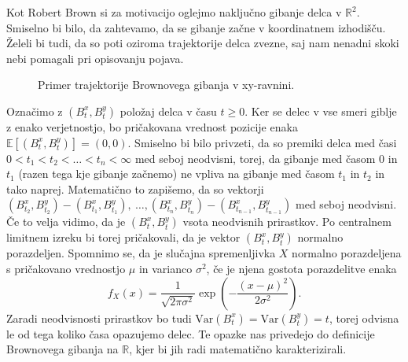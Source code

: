 \documentclass[twoside,11pt]{article}
\begin{document}
Kot Robert Brown si za motivacijo oglejmo naključno gibanje delca v $\mathbb{R}^2$.
Smiselno bi bilo, da zahtevamo, da se gibanje začne v koordinatnem izhodišču. Želeli bi tudi, da so 
poti oziroma trajektorije delca zvezne, saj nam nenadni skoki nebi pomagali pri opisovanju 
pojava.  

\begin{figure}[h]
    \centering

    \caption{Primer trajektorije Brownovega gibanja v xy-ravnini.}
    \label{fig:slika1}
\end{figure}

\noindent
Označimo z $\left(B^x_{t}, B^y_{t}\right)$ položaj delca v času $t \geq 0$. Ker se delec v vse 
smeri giblje z enako verjetnostjo, bo pričakovana vrednost pozicije enaka $\mathbb{E}\left[(B_t^x, B_t^y)\right] = (0, 0).$
Smiselno bi bilo privzeti, da so premiki delca med časi $0 < t_1 < t_2 < \dots < t_n < \infty$ med seboj neodvisni, torej, 
da gibanje med časom $0$ in $t_1$ (razen tega kje gibanje začnemo) ne vpliva na gibanje med časom $t_1$ in $t_2$ in tako naprej.
Matematično to zapišemo, da so vektorji $(B^x_{t_2}, B^y_{t_2}) - (B^x_{t_1}, B^y_{t_1}), \ \dots, (B^x_{t_n}, B^y_{t_n}) - (B^x_{t_{n-1}}, B^y_{t_{n-1}})$
med seboj neodvisni. Če to velja vidimo, da je $\left(B^x_{t}, B^y_{t}\right)$ vsota neodvisnih prirastkov. Po centralnem 
limitnem izreku bi torej pričakovali, da je vektor $\left(B^x_{t}, B^y_{t}\right)$ normalno porazdeljen.
Spomnimo se, da je slučajna spremenljivka $X$ normalno porazdeljena s pričakovano vrednostjo $\mu$ in varianco $\sigma^2$, če
je njena gostota porazdelitve enaka
$$
    f_X(x) = \frac{1}{\sqrt{2\pi\sigma^2}}\exp\left(-\frac{(x-\mu)^2}{2\sigma^2}\right).
$$
Zaradi neodvisnosti prirastkov bo tudi $\text{Var}(B_t^x) = \text{Var}(B_t^y) = t$, torej odvisna le od tega koliko 
časa opazujemo delec.
Te opazke nas privedejo do definicije Brownovega gibanja na $\mathbb{R}$, kjer bi jih radi matematično karakterizirali.
\end{document}
